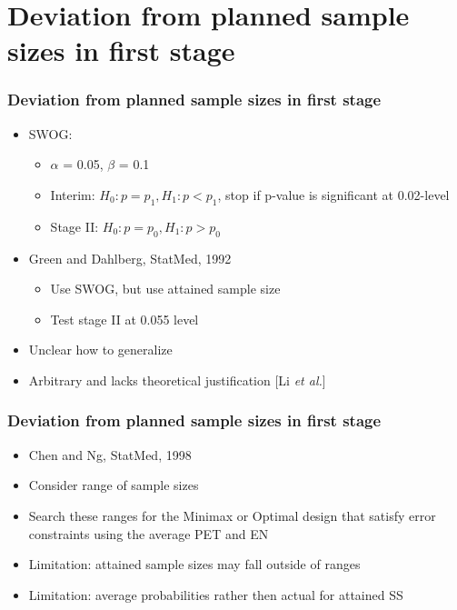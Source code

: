 \documentclass{beamer}\usepackage[]{graphicx}\usepackage[]{color}
\begin{document}
\section{Deviation from planned sample sizes in first stage}

\begin{frame}
\frametitle{Deviation from planned sample sizes in first stage}
    \begin{itemize}
        \item SWOG: 
        \begin{itemize}
            \item $\alpha$ = 0.05, $\beta$ = 0.1
            \item Interim: $H_0: p=p_1, H_1: p < p_1$, stop if p-value is significant at 0.02-level
            \item Stage II: $H_0: p=p_0, H_1: p > p_0$
        \end{itemize}
      \item Green and Dahlberg, StatMed, 1992
        \begin{itemize}
          \item Use SWOG, but use attained sample size
          \item Test stage II at 0.055 level %
        \end{itemize}
      \item Unclear how to generalize
      \item Arbitrary and lacks theoretical justification [Li \textit{et al.}]
    \end{itemize}
\end{frame}

\begin{frame}
\frametitle{Deviation from planned sample sizes in first stage}
    \begin{itemize}
      \item Chen and Ng, StatMed, 1998
      \item Consider range of sample sizes
      \item Search these ranges for the Minimax or Optimal design that satisfy error constraints using the average PET and EN
      \item Limitation: attained sample sizes may fall outside of ranges
      \item Limitation: average probabilities rather then actual for attained SS
    \end{itemize}
\end{frame}
\end{document}
